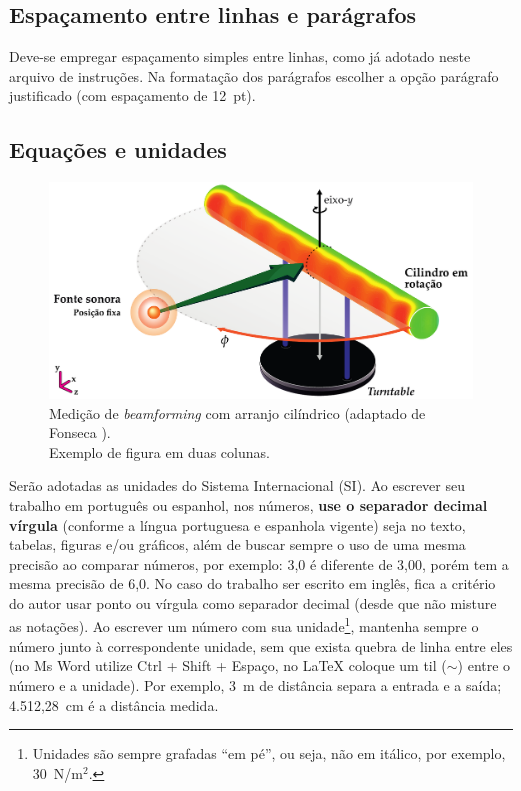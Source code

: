 \documentclass[12pt, a4paper, twoside, twocolumn]{article}
\begin{document}
\subsection{Espaçamento entre linhas e parágrafos}

Deve-se empregar espaçamento simples entre linhas, como já adotado neste arquivo de instruções.
Na formatação dos parágrafos escolher a opção parágrafo justificado (com espaçamento de 12~pt).


\subsection{Equações e unidades}

\begin{figure}[!ht] %
	\centering
	\includegraphics[width=0.74\linewidth]{figs/Measurement-Scheme-Fonseca-2013.pdf}%
	\caption{Medição de \textit{beamforming} com arranjo cilíndrico (adaptado de Fonseca \cite{Fonseca-2013}).\\ Exemplo de figura em duas colunas.}%
	\label{fig:beamforming}%
\end{figure}

Serão adotadas as unidades do Sistema Internacional (SI). Ao escrever seu trabalho em português ou espanhol, nos números, \textbf{use o separador decimal vírgula} (conforme a língua portuguesa e espanhola vigente) seja no texto, tabelas, figuras e/ou gráficos, além de buscar sempre o uso de uma mesma precisão ao comparar números, por exemplo: 3,0 é diferente de 3,00, porém tem a mesma precisão de 6,0. 
No caso do trabalho ser escrito em inglês, fica a critério do autor usar ponto ou vírgula como separador decimal (desde que não misture as notações).
Ao escrever um número com sua unidade\footnote{Unidades são sempre grafadas ``em pé'', ou seja, não em itálico, por exemplo, 30~N/m$^2$.}, mantenha sempre o número junto à correspondente unidade, sem que exista quebra de linha entre eles (no Ms Word utilize Ctrl + Shift + Espaço, no \LaTeX\xspace coloque um til ($\sim$) entre o número e a unidade). Por exemplo, 3~m de distância separa a entrada e a saída; 4.512,28~cm é a distância medida.
\end{document}
